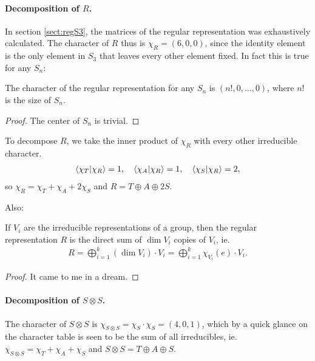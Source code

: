 \paragraph{Decomposition of $R$.} In section \ref{sect:regS3}, the matrices of the regular representation was exhaustively calculated. The character of $R$ thus is $\chi_R = (6,0,0)$, since the identity element is the only element in $S_3$ that leaves every other element fixed. In fact this is true for any $S_n$:
\begin{theorem}\label{thm:charregSn}
	 The character of the regular representation for any $S_n$ is $(n!, 0, \dots, 0)$, where $n!$ is the size of $S_n$.
\end{theorem}
\begin{proof}
	The center of $S_n$ is trivial.
\end{proof}

To decompose $R$, we take the inner product of $\chi_R$ with every other irreducible character.
\begin{align}
	\bra{\chi_T}\ket{\chi_R} = 1, \quad
	\bra{\chi_A}\ket{\chi_R} = 1, \quad
	\bra{\chi_S}\ket{\chi_R} = 2, 
\end{align}
so $\chi_R = \chi_T + \chi_A + 2\chi_S$ and $R = T \oplus A \oplus 2S$.

Also:
\begin{theorem}
	If $V_i$ are the irreducible representations of a group, then the regular representation $R$ is the direct sum of $\dim V_i$ copies of $V_i$, ie. 
	\begin{align}
		R = \bigoplus_{i=1}^{k} (\dim V_i) \cdot V_i = \bigoplus_{i=1}^{k} \chi_{V_i}(e) \cdot V_i .
	\end{align}
\end{theorem}
\begin{proof}
	It came to me in a dream. %
\end{proof}

\paragraph{Decomposition of $S \otimes S$.} The character of $S \otimes S$ is $\chi_{S \otimes S} = \chi_S \cdot \chi_S = (4,0,1)$, which by a quick glance on the character table is seen to be the sum of all irreducibles, ie. $\chi_{S \otimes S} = \chi_T + \chi_A + \chi_S$ and $S \otimes S = T \oplus A \oplus S$.

